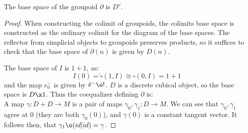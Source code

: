 \begin{lemma}\label{lem:base-of-groupoid}
	The base space of the groupoid $\partial$ is $D^v$.
\end{lemma}
\begin{proof}
	When constructing the colimit of groupoids, the colimits base space is constructed as the ordinary colimit for the diagram of the base spaces.
	The reflector from simplicial objects to groupoids preserves products, so it suffices to check that the base space of $\partial(n)$ is given by $D(n)$.
	
    The base space of $I$ is $1+1$, as:
    \[
        I(0) = \widehat{\square}(1,I) \cong \square(0,I) = 1 + 1
    \]
    and the map $e^-_0$ is given by $\delta^- \o !$. 
    $D$ is a discrete cubical object, so the base space is $D \x 1$.
    Thus the coequalizer defining $\partial$ is:
    \[\]
    A map $\gamma: D + D \to M$ is a pair of maps $\gamma_0, \gamma_1: D \to M$. 
    We can see that $\gamma_0, \gamma_1$ agree at $0$ (they are both $\gamma_0(0)$), and $\gamma(0)$ is a constant tangent vector. It follows then, that $\gamma_1 \o (id | id) = \gamma$.

\end{proof}
